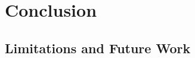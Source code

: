 \documentclass[aspectratio=169]{beamer}
\begin{document}
\section{Conclusion}
\subsection{Limitations and Future Work}

\end{document}
